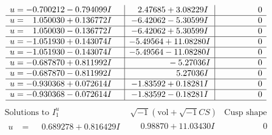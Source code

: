 \documentclass[1p]{elsarticle_modified}
\theoremstyle{definition}
\newcommand{\I}{\sqrt{-1}}
\begin{document}
$$\begin{array}{c|c|c}
\begin{aligned}
u &= -0.700212 - 0.794099 I\end{aligned}
 & \phantom{-}2.47685 + 3.08229 I & \phantom{-0.000000 } 0 \\ \hline\begin{aligned}
u &= \phantom{-}1.050030 + 0.136772 I\end{aligned}
 & -6.42062 - 5.30599 I & \phantom{-0.000000 } 0 \\ \hline\begin{aligned}
u &= \phantom{-}1.050030 - 0.136772 I\end{aligned}
 & -6.42062 + 5.30599 I & \phantom{-0.000000 } 0 \\ \hline\begin{aligned}
u &= -1.051930 + 0.143074 I\end{aligned}
 & -5.49564 + 11.08280 I & \phantom{-0.000000 } 0 \\ \hline\begin{aligned}
u &= -1.051930 - 0.143074 I\end{aligned}
 & -5.49564 - 11.08280 I & \phantom{-0.000000 } 0 \\ \hline\begin{aligned}
u &= -0.687870 + 0.811992 I\end{aligned}
 & \phantom{-0.000000 } -5.27036 I & \phantom{-0.000000 } 0 \\ \hline\begin{aligned}
u &= -0.687870 - 0.811992 I\end{aligned}
 & \phantom{-0.000000 -}5.27036 I & \phantom{-0.000000 } 0 \\ \hline\begin{aligned}
u &= -0.930368 + 0.072614 I\end{aligned}
 & -1.83592 + 0.18281 I & \phantom{-0.000000 } 0 \\ \hline\begin{aligned}
u &= -0.930368 - 0.072614 I\end{aligned}
 & -1.83592 - 0.18281 I & \phantom{-0.000000 } 0\\
 \hline 
 \end{array}$$\newpage$$\begin{array}{c|c|c}  
\text{Solutions to }I^u_{1}& \I (\text{vol} + \sqrt{-1}CS) & \text{Cusp shape}\\
 \hline 
\begin{aligned}
u &= \phantom{-}0.689278 + 0.816429 I\end{aligned}
 & \phantom{-}0.98870 + 11.03430 I & \phantom{-0.000000 } 0 \\ \hline\begin{aligned}

\end{aligned}
\end{array}$$
\end{document}
